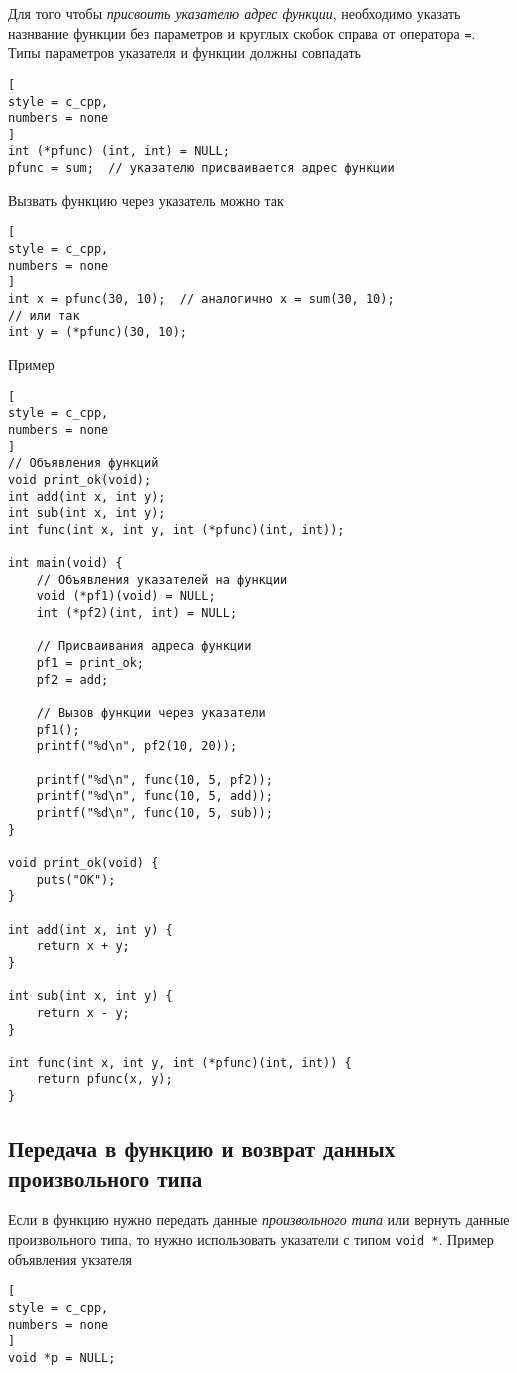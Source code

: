 \documentclass[%
	11pt,
	a4paper,
	utf8,
		]{article}
\begin{document}
Для того чтобы \emph{присвоить указателю адрес функции}, необходимо указать назнвание функции без параметров и круглых скобок справа от оператора \verb|=|. Типы параметров указателя и функции должны совпадать
\begin{lstlisting}[
style = c_cpp,
numbers = none
]
int (*pfunc) (int, int) = NULL;
pfunc = sum;  // указателю присваивается адрес функции
\end{lstlisting}

Вызвать функцию через указатель можно так
\begin{lstlisting}[
style = c_cpp,
numbers = none
]
int x = pfunc(30, 10);  // аналогично x = sum(30, 10);
// или так
int y = (*pfunc)(30, 10);
\end{lstlisting}

Пример
\begin{lstlisting}[
style = c_cpp,
numbers = none
]
// Объявления функций
void print_ok(void);
int add(int x, int y);
int sub(int x, int y);
int func(int x, int y, int (*pfunc)(int, int));

int main(void) {
    // Объявления указателей на функции
    void (*pf1)(void) = NULL;
    int (*pf2)(int, int) = NULL;
    
    // Присваивания адреса функции
    pf1 = print_ok;
    pf2 = add;
    
    // Вызов функции через указатели
    pf1();
    printf("%d\n", pf2(10, 20));
    
    printf("%d\n", func(10, 5, pf2));
    printf("%d\n", func(10, 5, add));
    printf("%d\n", func(10, 5, sub));
}

void print_ok(void) {
    puts("OK");
}

int add(int x, int y) {
    return x + y;
}

int sub(int x, int y) {
    return x - y;
}

int func(int x, int y, int (*pfunc)(int, int)) {
    return pfunc(x, y);
}
\end{lstlisting}

\subsection{Передача в функцию и возврат данных произвольного типа}

Если в функцию нужно передать данные \emph{произвольного типа} или вернуть данные произвольного типа, то нужно использовать указатели с типом \verb|void *|. Пример объявления укзателя
\begin{lstlisting}[
style = c_cpp,
numbers = none
]
void *p = NULL;
\end{lstlisting}
\end{document}

